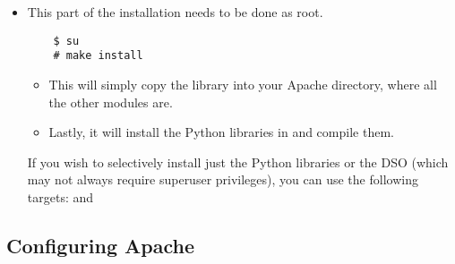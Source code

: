 \begin{itemize}

\item
  This part of the installation needs to be done as root. 
  \begin{verbatim}
    $ su
    # make install
  \end{verbatim}
  
  \begin{itemize}

  \item
    This will simply copy the library into your Apache 
    directory, where all the other modules are.


  \item
    Lastly, it will install the Python libraries in  and
    compile them. 

  \end{itemize} 

   If you wish to selectively install just the Python libraries
  or the DSO (which may not always require superuser
  privileges), you can use the following  targets:
   and 

\end{itemize}

\subsection{Configuring Apache\label{inst-apacheconfig}}

